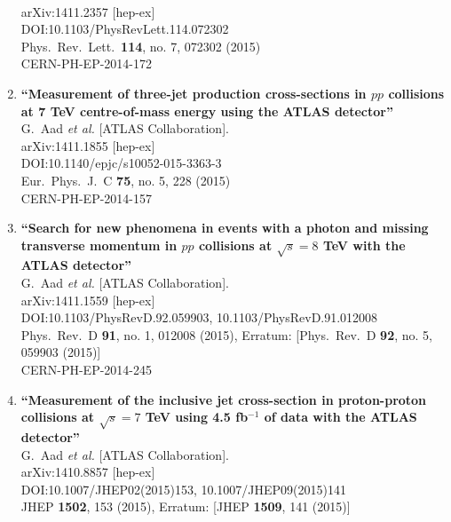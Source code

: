 \documentclass{article}
\begin{document}
\begin{enumerate}
  \\{}arXiv:1411.2357 [hep-ex]
  \\{}DOI:10.1103/PhysRevLett.114.072302
  \\{}Phys.\ Rev.\ Lett.\  {\bf 114}, no. 7, 072302 (2015)
  \\{}CERN-PH-EP-2014-172
\item%
{\bf ``Measurement of three-jet production cross-sections in $pp$ collisions at 7 TeV centre-of-mass energy using the ATLAS detector''}
  \\{}G.~Aad {\it et al.} [ATLAS Collaboration].
  \\{}arXiv:1411.1855 [hep-ex]
  \\{}DOI:10.1140/epjc/s10052-015-3363-3
  \\{}Eur.\ Phys.\ J.\ C {\bf 75}, no. 5, 228 (2015)
  \\{}CERN-PH-EP-2014-157
\item%
{\bf ``Search for new phenomena in events with a photon and missing transverse momentum in $pp$ collisions at $\sqrt{s}=8$ TeV with the ATLAS detector''}
  \\{}G.~Aad {\it et al.} [ATLAS Collaboration].
  \\{}arXiv:1411.1559 [hep-ex]
  \\{}DOI:10.1103/PhysRevD.92.059903, 10.1103/PhysRevD.91.012008
  \\{}Phys.\ Rev.\ D {\bf 91}, no. 1, 012008 (2015), Erratum: [Phys.\ Rev.\ D {\bf 92}, no. 5, 059903 (2015)]
  \\{}CERN-PH-EP-2014-245
\item%
{\bf ``Measurement of the inclusive jet cross-section in proton-proton collisions at $ \sqrt{s}=7 $ TeV using 4.5 fb$^{−1}$ of data with the ATLAS detector''}
  \\{}G.~Aad {\it et al.} [ATLAS Collaboration].
  \\{}arXiv:1410.8857 [hep-ex]
  \\{}DOI:10.1007/JHEP02(2015)153, 10.1007/JHEP09(2015)141
  \\{}JHEP {\bf 1502}, 153 (2015), Erratum: [JHEP {\bf 1509}, 141 (2015)]

\end{enumerate}
\end{document}
